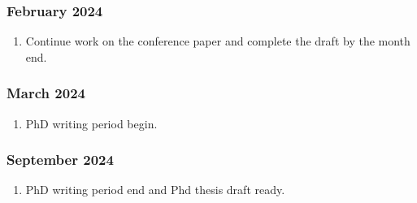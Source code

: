  \subsubsection{February 2024}
  \begin{enumerate}
    \item Continue work on the conference paper and complete the draft by the month end.
 \end{enumerate}

 \subsubsection{March 2024}
  \begin{enumerate}
    \item PhD writing period begin.
 \end{enumerate}

 \subsubsection{September 2024}
  \begin{enumerate}
    \item PhD writing period end and Phd thesis draft ready.
 \end{enumerate}











